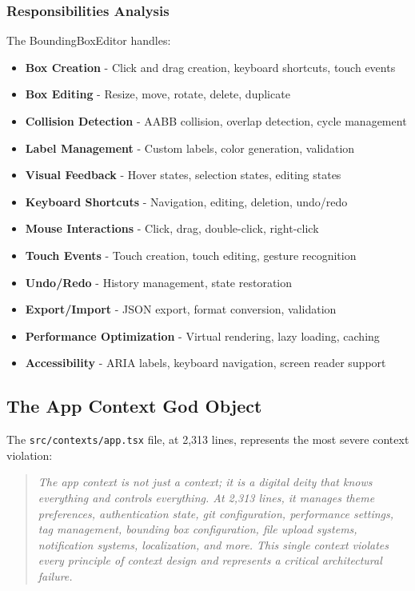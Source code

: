 \documentclass[11pt]{article}
\begin{document}
\subsubsection{Responsibilities Analysis}

The BoundingBoxEditor handles:

\begin{itemize}
\item \textbf{Box Creation} - Click and drag creation, keyboard shortcuts, touch events
\item \textbf{Box Editing} - Resize, move, rotate, delete, duplicate
\item \textbf{Collision Detection} - AABB collision, overlap detection, cycle management
\item \textbf{Label Management} - Custom labels, color generation, validation
\item \textbf{Visual Feedback} - Hover states, selection states, editing states
\item \textbf{Keyboard Shortcuts} - Navigation, editing, deletion, undo/redo
\item \textbf{Mouse Interactions} - Click, drag, double-click, right-click
\item \textbf{Touch Events} - Touch creation, touch editing, gesture recognition
\item \textbf{Undo/Redo} - History management, state restoration
\item \textbf{Export/Import} - JSON export, format conversion, validation
\item \textbf{Performance Optimization} - Virtual rendering, lazy loading, caching
\item \textbf{Accessibility} - ARIA labels, keyboard navigation, screen reader support
\end{itemize}

\subsection{The App Context God Object}

The \texttt{src/contexts/app.tsx} file, at 2,313 lines, represents the most severe context violation:

\begin{quote}
\emph{The app context is not just a context; it is a digital deity that knows everything and controls everything. At 2,313 lines, it manages theme preferences, authentication state, git configuration, performance settings, tag management, bounding box configuration, file upload systems, notification systems, localization, and more. This single context violates every principle of context design and represents a critical architectural failure.}
\end{quote}
\end{document}
